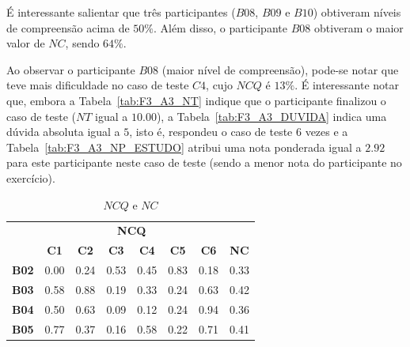 É interessante salientar que três participantes ($B08$, $B09$ e $B10$) obtiveram níveis de compreensão acima de $50\%$. Além disso, o participante $B08$ obtiveram o maior valor de $NC$, sendo $64\%$.

Ao observar o participante $B08$ (maior nível de compreensão), pode-se notar que teve mais dificuldade no caso de teste $C4$, cujo $NCQ$ é $13\%$. É interessante notar que, embora a Tabela~\ref{tab:F3_A3_NT} indique que o participante finalizou o caso de teste ($NT$ igual a $10.00$), a Tabela~\ref{tab:F3_A3_DUVIDA} indica uma dúvida absoluta igual a $5$, isto é, respondeu o caso de teste 6 vezes e a Tabela~\ref{tab:F3_A3_NP_ESTUDO} atribui uma nota ponderada igual a $2.92$ para este participante neste caso de teste (sendo a menor nota do participante no exercício).

\begin{table}[htbp]
	\centering
	\caption{$NCQ$ e $NC$}
	\begin{tabular}{|c|cccccc|c|}
		\hline
		\rowcolor[HTML]{D0CECE} 
		\cellcolor[HTML]{D9D9D9} & \multicolumn{6}{c|}{\cellcolor[HTML]{D0CECE}\textbf{NCQ}} & \cellcolor[HTML]{D9D9D9} \\ \cline{2-7}
		\rowcolor[HTML]{D9D9D9} 
		\multirow{-2}{*}{\cellcolor[HTML]{D9D9D9}\textbf{Participante}} & \multicolumn{1}{c|}{\cellcolor[HTML]{D9D9D9}\textbf{C1}} & \multicolumn{1}{c|}{\cellcolor[HTML]{D9D9D9}\textbf{C2}} & \multicolumn{1}{c|}{\cellcolor[HTML]{D9D9D9}\textbf{C3}} & \multicolumn{1}{c|}{\cellcolor[HTML]{D9D9D9}\textbf{C4}} & \multicolumn{1}{c|}{\cellcolor[HTML]{D9D9D9}\textbf{C5}} & \textbf{C6} & \multirow{-2}{*}{\cellcolor[HTML]{D9D9D9}\textbf{NC}} \\ \hline
		\textbf{B02} & \multicolumn{1}{c|}{0.00} & \multicolumn{1}{c|}{0.24} & \multicolumn{1}{c|}{0.53} & \multicolumn{1}{c|}{0.45} & \multicolumn{1}{c|}{0.83} & 0.18 & 0.33 \\ \hline
		\rowcolor[HTML]{D9D9D9} 
		\textbf{B03} & \multicolumn{1}{c|}{\cellcolor[HTML]{D9D9D9}0.58} & \multicolumn{1}{c|}{\cellcolor[HTML]{D9D9D9}0.88} & \multicolumn{1}{c|}{\cellcolor[HTML]{D9D9D9}0.19} & \multicolumn{1}{c|}{\cellcolor[HTML]{D9D9D9}0.33} & \multicolumn{1}{c|}{\cellcolor[HTML]{D9D9D9}0.24} & 0.63 & 0.42 \\ \hline
		\textbf{B04} & \multicolumn{1}{c|}{0.50} & \multicolumn{1}{c|}{0.63} & \multicolumn{1}{c|}{0.09} & \multicolumn{1}{c|}{0.12} & \multicolumn{1}{c|}{0.24} & 0.94 & 0.36 \\ \hline
		\rowcolor[HTML]{D9D9D9} 
		\textbf{B05} & \multicolumn{1}{c|}{\cellcolor[HTML]{D9D9D9}0.77} & \multicolumn{1}{c|}{\cellcolor[HTML]{D9D9D9}0.37} & \multicolumn{1}{c|}{\cellcolor[HTML]{D9D9D9}0.16} & \multicolumn{1}{c|}{\cellcolor[HTML]{D9D9D9}0.58} & \multicolumn{1}{c|}{\cellcolor[HTML]{D9D9D9}0.22} & 0.71 & 0.41 \\ \hline

\end{tabular}
\end{table}
